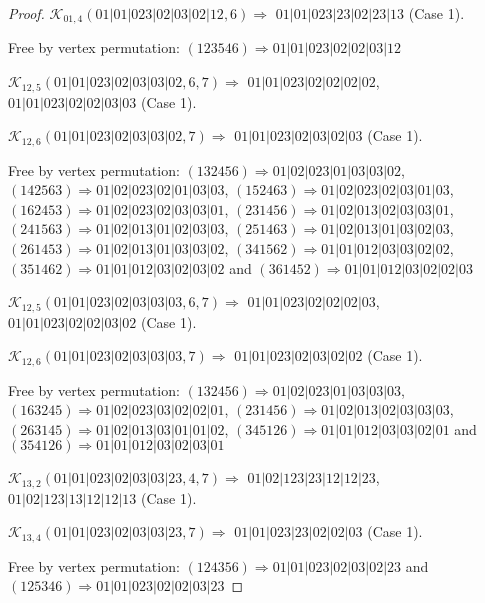 \documentclass[12pt]{article}
\theoremstyle{plain}
\theoremstyle{definition}
\theoremstyle{remark}
\newcommand{\fancy}[1]{\mathcal{#1}}
\def\K{\fancy{K}}
\begin{document}
\begin{proof}
	$\K_{01,4}(01|01|023|02|03|02|12,6)\Rightarrow $ $01|01|023|23|02|23|13$ (Case 1).
	
	
	
	Free by vertex permutation: $(1 2 3 5 4 6)\Rightarrow 01|01|023|02|02|03|12$
	
	
	
	\bigskip
	
	$\K_{12,5}(01|01|023|02|03|03|02,6, 7)\Rightarrow $ $01|01|023|02|02|02|02$, $01|01|023|02|02|03|03$ (Case 1).
	
	$\K_{12,6}(01|01|023|02|03|03|02,7)\Rightarrow $ $01|01|023|02|03|02|03$ (Case 1).
	
	
	
	Free by vertex permutation: $(1 3 2 4 5 6)\Rightarrow 01|02|023|01|03|03|02$, $(1 4 2 5 6 3)\Rightarrow 01|02|023|02|01|03|03$, $(1 5 2 4 6 3)\Rightarrow 01|02|023|02|03|01|03$, $(1 6 2 4 5 3)\Rightarrow 01|02|023|02|03|03|01$, $(2 3 1 4 5 6)\Rightarrow 01|02|013|02|03|03|01$, $(2 4 1 5 6 3)\Rightarrow 01|02|013|01|02|03|03$, $(2 5 1 4 6 3)\Rightarrow 01|02|013|01|03|02|03$, $(2 6 1 4 5 3)\Rightarrow 01|02|013|01|03|03|02$, $(3 4 1 5 6 2)\Rightarrow 01|01|012|03|03|02|02$, $(3 5 1 4 6 2)\Rightarrow 01|01|012|03|02|03|02$ and $(3 6 1 4 5 2)\Rightarrow 01|01|012|03|02|02|03$
	
	
	
	\bigskip
	
	$\K_{12,5}(01|01|023|02|03|03|03,6, 7)\Rightarrow $ $01|01|023|02|02|02|03$, $01|01|023|02|02|03|02$ (Case 1).
	
	$\K_{12,6}(01|01|023|02|03|03|03,7)\Rightarrow $ $01|01|023|02|03|02|02$ (Case 1).
	
	
	
	Free by vertex permutation: $(1 3 2 4 5 6)\Rightarrow 01|02|023|01|03|03|03$, $(1 6 3 2 4 5)\Rightarrow 01|02|023|03|02|02|01$, $(2 3 1 4 5 6)\Rightarrow 01|02|013|02|03|03|03$, $(2 6 3 1 4 5)\Rightarrow 01|02|013|03|01|01|02$, $(3 4 5 1 2 6)\Rightarrow 01|01|012|03|03|02|01$ and $(3 5 4 1 2 6)\Rightarrow 01|01|012|03|02|03|01$
	
	
	
	\bigskip
	
	$\K_{13,2}(01|01|023|02|03|03|23,4, 7)\Rightarrow $ $01|02|123|23|12|12|23$, $01|02|123|13|12|12|13$ (Case 1).
	
	$\K_{13,4}(01|01|023|02|03|03|23,7)\Rightarrow $ $01|01|023|23|02|02|03$ (Case 1).
	
	
	
	Free by vertex permutation: $(1 2 4 3 5 6)\Rightarrow 01|01|023|02|03|02|23$ and $(1 2 5 3 4 6)\Rightarrow 01|01|023|02|02|03|23$
	

\end{proof}
\end{document}
